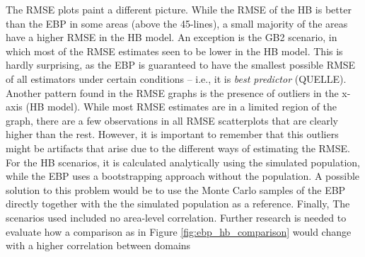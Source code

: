 The RMSE plots paint a different picture.
While the RMSE of the HB is better than the EBP in some areas (above the 45-lines), a small majority of the areas have a higher RMSE in the HB model.
An exception is the GB2 scenario, in which most of the RMSE estimates seen to be lower in the HB model.
This is hardly surprising, as the EBP is guaranteed to have the smallest possible RMSE of all estimators under certain conditions – i.e., it is \textit{best predictor} (QUELLE).
Another pattern found in the RMSE graphs is the presence of outliers in the x-axis (HB model).
While most RMSE estimates are in a limited region of the graph, there are a few observations in all RMSE scatterplots that are clearly higher than the rest.
However, it is important to remember that this outliers might be artifacts that arise due to the different ways of estimating the RMSE.
For the HB scenarios, it is calculated analytically using the simulated population, while the EBP uses a bootstrapping approach without the population.
A possible solution to this problem would be to use the Monte Carlo samples of the EBP directly together with the the simulated population as a reference.
Finally, The scenarios used included no area-level correlation.
Further research is needed to evaluate how a comparison as in Figure \ref{fig:ebp_hb_comparison} would change with a higher correlation between domains


